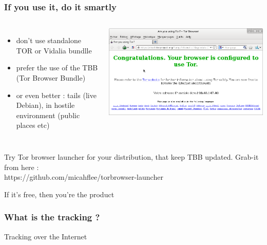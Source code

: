 \begin{frame}
\frametitle{If you use it, do it smartly}
\begin{columns}[c]
\begin{itemize}
\item don't use standalone TOR or Vidalia bundlle
\item prefer the use of the TBB (Tor Browser Bundle)
\item or even better : tails (live Debian), in hostile environment
(public places etc)
\end{itemize}
\includegraphics[keepaspectratio,width=\textwidth, height=.8\textheight]{./materials/tbb}
\end{columns}
Try Tor browser launcher for your distribution, that keep TBB updated. Grab-it
from here :\\ https://github.com/micahflee/torbrowser-launcher
\end{frame}
\begin{frame}
\begin{center}
\Huge{If it's free, then you're the product}
\end{center}
\end{frame}

\begin{frame}
\frametitle{What is the tracking ?}

\begin{block}{Tracking over the Internet}
\begin{itemize}
\end{itemize}
\end{block}
\end{frame}



